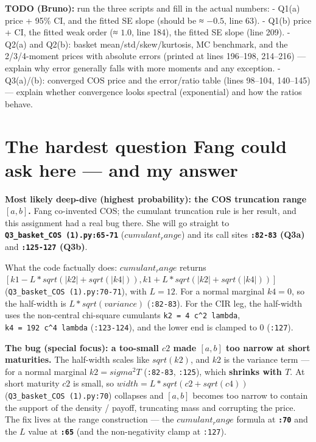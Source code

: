 \documentclass[
  11pt,
]{article}
\begin{document}
\textbf{TODO (Bruno):} run the three scripts and fill in the actual
numbers: - Q1(a) price + 95\% CI, and the fitted SE slope (should be ≈
\(-0.5\), line 63). - Q1(b) price + CI, the fitted weak order (≈
\(1.0\), line 184), the fitted SE slope (line 209). - Q2(a) and Q2(b):
basket mean/std/skew/kurtosis, MC benchmark, and the 2/3/4-moment prices
with absolute errors (printed at lines 196--198, 214--216) --- explain
why error generally falls with more moments and any exception. -
Q3(a)/(b): converged COS price and the error/ratio table (lines 98--104,
140--145) --- explain whether convergence looks spectral (exponential)
and how the ratios behave.

\hypertarget{the-hardest-question-fang-could-ask-here-and-my-answer}{%
\section{The hardest question Fang could ask here --- and my
answer}\label{the-hardest-question-fang-could-ask-here-and-my-answer}}

\textbf{Most likely deep-dive (highest probability): the COS truncation
range \([a,b]\).} Fang co-invented COS; the cumulant truncation rule is
her result, and this assignment had a real bug there. She will go
straight to \textbf{\texttt{Q3\_basket\_COS\ (1).py:65-71}}
(\(cumulant_range\)) and its call sites \textbf{\texttt{:82-83} (Q3a)}
and \textbf{\texttt{:125-127} (Q3b)}.

What the code factually does: \(cumulant_range\) returns
\([k1 - L*sqrt(|k2| + sqrt(|k4|)), k1 + L*sqrt(|k2| + sqrt(|k4|))]\)
(\texttt{Q3\_basket\_COS\ (1).py:70-71}), with \(L = 12\). For a normal
marginal \(k4 = 0\), so the half-width is \(L*sqrt(variance)\)
(\texttt{:82-83}). For the CIR leg, the half-width uses the non-central
chi-square cumulants \texttt{k2\ =\ 4\ c\^{}2\ lambda},
\texttt{k4\ =\ 192\ c\^{}4\ lambda} (\texttt{:123-124}), and the lower
end is clamped to \(0\) (\texttt{:127}).

\textbf{The bug (special focus): a too-small \(c2\) made \([a,b]\) too
narrow at short maturities.} The half-width scales like \(sqrt(k2)\),
and \(k2\) is the variance term --- for a normal marginal
\(k2 = sigma^2 T\) (\texttt{:82-83}, \texttt{:125}), which
\textbf{shrinks with \(T\)}. At short maturity \(c2\) is small, so
\(width = L*sqrt(c2 + sqrt(c4))\) (\texttt{Q3\_basket\_COS\ (1).py:70})
collapses and \([a,b]\) becomes too narrow to contain the support of the
density / payoff, truncating mass and corrupting the price. The fix
lives at the range construction --- the \(cumulant_range\) formula at
\textbf{\texttt{:70}} and the \(L\) value at \textbf{\texttt{:65}} (and
the non-negativity clamp at \texttt{:127}).
\end{document}
